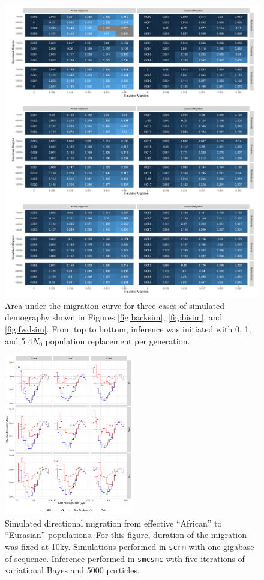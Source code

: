 \documentclass{article}
\begin{document}
\begin{figure}
	\centering
	\includegraphics[width=\textwidth]{../plot/sims/all_integrated_sims.pdf}
	\caption{Area under the migration curve for three cases of simulated demography shown in Figures \ref{fig:backsim}, \ref{fig:bisim}, and \ref{fig:fwdsim}. From top to bottom, inference was initiated with 0, 1, and 5 4$N_0$ population replacement per generation.}
	\label{fig:intsim}
\end{figure}


\begin{figure}
	\centering
	\includegraphics[width=0.5\textwidth]{../plot/old_all_li_durbin.pdf}
	\caption{Simulated directional migration from effective ``African'' to ``Eurasian'' populations. For this figure, duration of the migration was fixed at 10ky. Simulations performed in {\tt scrm} with one gigabase of sequence. Inference performed in {\tt smcsmc} with five iterations of variational Bayes and 5000 particles.}
	\label{nesims_10ky}
\end{figure}
\end{document}
